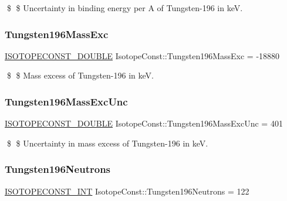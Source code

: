 \$ \$ Uncertainty in binding energy per A of Tungsten-\/196 in keV. \mbox{\label{group___isotope_const-_tungsten-_w196_ga5c89d29392b48868a7dc09e25f6405bd}} 
\subsubsection{\texorpdfstring{Tungsten196\+Mass\+Exc}{Tungsten196MassExc}}
{\footnotesize\ttfamily \mbox{\hyperlink{group___isotope_const-_macros_ga8f45a7272ce02c0b4c65c44636ed719a}{I\+S\+O\+T\+O\+P\+E\+C\+O\+N\+S\+T\+\_\+\+D\+O\+U\+B\+LE}} Isotope\+Const\+::\+Tungsten196\+Mass\+Exc = -\/18880}

\$ \$ Mass excess of Tungsten-\/196 in keV. \mbox{\label{group___isotope_const-_tungsten-_w196_ga7d3552664f18eb4810494edbcf453649}} 
\subsubsection{\texorpdfstring{Tungsten196\+Mass\+Exc\+Unc}{Tungsten196MassExcUnc}}
{\footnotesize\ttfamily \mbox{\hyperlink{group___isotope_const-_macros_ga8f45a7272ce02c0b4c65c44636ed719a}{I\+S\+O\+T\+O\+P\+E\+C\+O\+N\+S\+T\+\_\+\+D\+O\+U\+B\+LE}} Isotope\+Const\+::\+Tungsten196\+Mass\+Exc\+Unc = 401}

\$ \$ Uncertainty in mass excess of Tungsten-\/196 in keV. \mbox{\label{group___isotope_const-_tungsten-_w196_ga8ada411fbec82ef8b5c00b6df602b960}} 
\subsubsection{\texorpdfstring{Tungsten196\+Neutrons}{Tungsten196Neutrons}}
{\footnotesize\ttfamily \mbox{\hyperlink{group___isotope_const-_macros_ga5f18360b3e99483a35c32d789e62621c}{I\+S\+O\+T\+O\+P\+E\+C\+O\+N\+S\+T\+\_\+\+I\+NT}} Isotope\+Const\+::\+Tungsten196\+Neutrons = 122}


